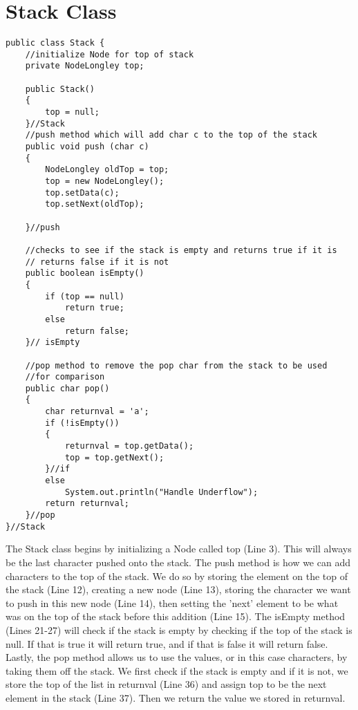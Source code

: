 \documentclass{article}
\begin{document}
\section{Stack Class}
\small
\begin{lstlisting}[frame=single, 
backgroundcolor = \color{grey!12}]
public class Stack {
	//initialize Node for top of stack
	private NodeLongley top; 
	
	public Stack()
	{
		top = null;
	}//Stack
	//push method which will add char c to the top of the stack
	public void push (char c)
	{
		NodeLongley oldTop = top;
		top = new NodeLongley();
		top.setData(c);
		top.setNext(oldTop);

	}//push
	
	//checks to see if the stack is empty and returns true if it is
	// returns false if it is not
	public boolean isEmpty() 
	{
		if (top == null)
			return true;
		else
			return false;
	}// isEmpty
	
	//pop method to remove the pop char from the stack to be used 
	//for comparison
	public char pop()
	{
		char returnval = 'a';
		if (!isEmpty())
		{
			returnval = top.getData();
			top = top.getNext();
		}//if
		else
			System.out.println("Handle Underflow");
		return returnval; 
	}//pop
}//Stack
\end{lstlisting}
\large

The Stack class begins by initializing a Node called top (Line 3). This will always be the last character pushed onto the stack. The push method is how we can add characters to the top of the stack. We do so by storing the element on the top of the stack (Line 12), creating a new node (Line 13), storing the character we want to push in this new node (Line 14), then setting the 'next' element to be what was on the top of the stack before this addition (Line 15). The isEmpty method (Lines 21-27) will check if the stack is empty by checking if the top of the stack is null. If that is true it will return true, and if that is false it will return false. Lastly, the pop method allows us to use the values, or in this case characters, by taking them off the stack. We first check if the stack is empty and if it is not, we store the top of the list in returnval (Line 36) and assign top to be the next element in the stack (Line 37). Then we return the value we stored in returnval. 
\end{document}
